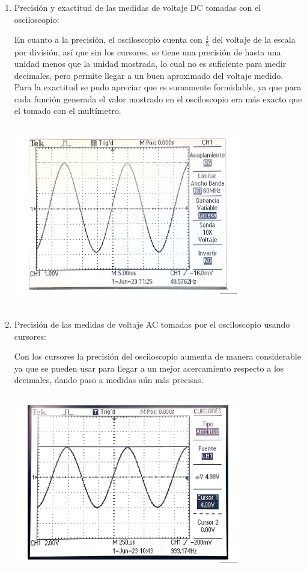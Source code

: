 \documentclass[12pt]{article}
\begin{document}
	\begin{enumerate}
		
		\item Precisión y exactitud de las medidas de voltaje DC
		tomadas con el osciloscopio:
		
		\noindent En cuanto a la precisión, el osciloscopio cuenta con $\frac{1}{5}$ del voltaje de la escala por división, así que sin los cursores, se tiene una precisión de hasta una unidad menos que la unidad mostrada, lo cual no es suficiente para medir decimales, pero permite llegar a un buen aproximado del voltaje medido.\\
		
		\noindent Para la exactitud se pudo apreciar que es sumamente formidable, ya que para cada función generada el valor mostrado en el osciloscopio era más exacto que el tomado con el multímetro.\\
		
		\begin{center}
			\includegraphics[width=10cm,height=8cm]{Img/medicion_sin_cursores}
		\end{center}
		
		\item Precisión de las medidas de voltaje AC tomadas por el osciloscopio usando cursores:
		
		\noindent Con los cursores la precisión del osciloscopio aumenta de manera considerable ya que se pueden usar para llegar a un mejor acercamiento respecto a los decimales, dando paso a medidas aún más precisas.
		
		\begin{center}
			\includegraphics[width=10cm,height=8cm]{Img/medicion_cursores}
		\end{center}
		

\end{enumerate}
\end{document}
